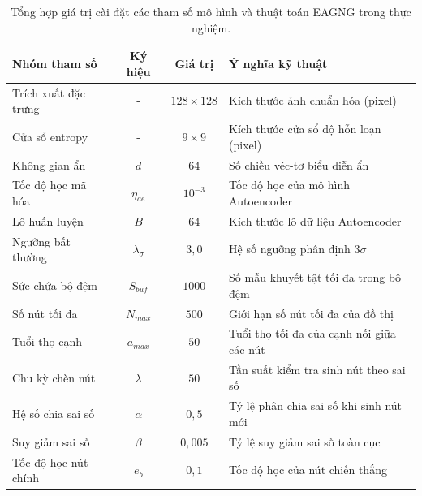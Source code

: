 \begin{table}[htbp]
\centering
\caption{Tổng hợp giá trị cài đặt các tham số mô hình và thuật toán EAGNG trong thực nghiệm.}
\label{tab:eagng_parameters}

\renewcommand{\arraystretch}{1.15}
\setlength{\tabcolsep}{5pt}

\begin{tabularx}{\textwidth}{|l|c|c|X|}
\hline
Nhóm tham số & Ký hiệu & Giá trị & Ý nghĩa kỹ thuật \\ \hline

Trích xuất đặc trưng 
& - & $128 \times 128$ 
& Kích thước ảnh chuẩn hóa (pixel) \\ \hline

Cửa sổ entropy 
& - & $9 \times 9$ 
& Kích thước cửa sổ độ hỗn loạn (pixel) \\ \hline

Không gian ẩn 
& $d$ & $64$ 
& Số chiều véc-tơ biểu diễn ẩn \\ \hline

Tốc độ học mã hóa 
& $\eta_{ae}$ & $10^{-3}$ 
& Tốc độ học của mô hình Autoencoder \\ \hline

Lô huấn luyện 
& $B$ & $64$ 
& Kích thước lô dữ liệu Autoencoder \\ \hline

Ngưỡng bất thường 
& $\lambda_{\sigma}$ & $3{,}0$ 
& Hệ số ngưỡng phân định $3\sigma$ \\ \hline

Sức chứa bộ đệm 
& $S_{buf}$ & $1000$ 
& Số mẫu khuyết tật tối đa trong bộ đệm \\ \hline

Số nút tối đa 
& $N_{max}$ & $500$ 
& Giới hạn số nút tối đa của đồ thị \\ \hline

Tuổi thọ cạnh 
& $a_{max}$ & $50$ 
& Tuổi thọ tối đa của cạnh nối giữa các nút \\ \hline

Chu kỳ chèn nút 
& $\lambda$ & $50$ 
& Tần suất kiểm tra sinh nút theo sai số \\ \hline

Hệ số chia sai số 
& $\alpha$ & $0{,}5$ 
& Tỷ lệ phân chia sai số khi sinh nút mới \\ \hline

Suy giảm sai số 
& $\beta$ & $0{,}005$ 
& Tỷ lệ suy giảm sai số toàn cục \\ \hline

Tốc độ học nút chính 
& $e_b$ & $0{,}1$ 
& Tốc độ học của nút chiến thắng \\ \hline


\end{tabularx}
\end{table}
